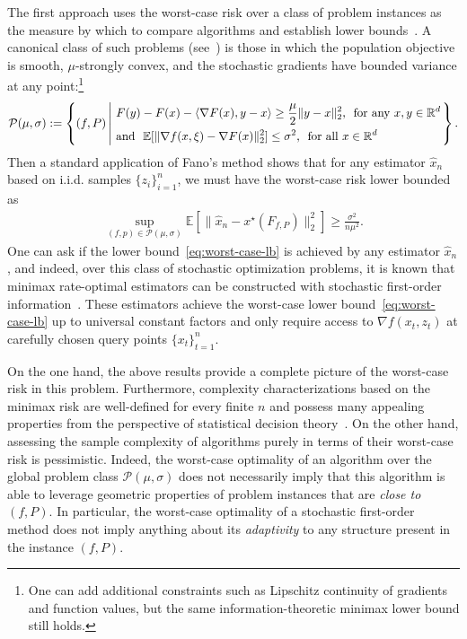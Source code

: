 \documentclass[11pt,twoside]{article}
\numberwithin{equation}{section}
\newcommand{\EE}{\mathbb{E}}
\newcommand{\RR}{\mathbb{R}}
\newcommand{\1}{\mathbf{1}}
\newcommand{\dotp}[1]{\left\langle #1\right\rangle}
\theoremstyle{remark}
\theoremstyle{plain}
\begin{document}
    The first approach uses the worst-case risk over a class of problem instances as the  measure by which to compare algorithms and establish lower bounds~\cite{complexity,agarwal2009information}. 
    A canonical class of such problems (see~\cite{ghadimi2012optimal}) is those in which the population objective is smooth, $\mu$-strongly convex, and the stochastic gradients have bounded variance at any point:\footnote{One can add additional constraints such as Lipschitz continuity of gradients and function values, but the same information-theoretic minimax lower bound still holds.} 
    \begin{align*}
        \mathcal{P}(\mu, \sigma) := \left\{ (f,P) \left| 
	\begin{aligned}
	&\text{ $ F(y) - F(x) - \dotp{\nabla F(x), y-x}\ge \frac{\mu}{2}\|y-x\|_2^2$,  \ for any $x,y \in \RR^d$} \\
	& \text{ and \ $\EE[\|\nabla f(x,\xi) - \nabla F(x)\|_2^2] \le \sigma^2$, \ for all $x \in \RR^d$}
	\end{aligned}
	\right.\right\}.
        \end{align*}
        Then a standard application of Fano's method shows that for any estimator $\widehat{x}_n$ based on i.i.d. samples $\{z_i\}_{i=1}^{n}$, we must have
        the worst-case risk lower bounded as 
        \begin{align} \label{eq:worst-case-lb}
         \sup_{(f,p) \in \mathcal{P}(\mu,\sigma)} \EE[\|\widehat x_n - x^\star(F_{f,P})\|_2^2] \ge \frac{\sigma^2}{n\mu^2}.
        \end{align}
    One can ask if the lower bound~\eqref{eq:worst-case-lb} is achieved by any estimator $\widehat{x}_n$, and indeed,
    over this class of stochastic optimization problems, it is known that minimax rate-optimal estimators can be constructed with stochastic first-order information~\cite{ghadimi2012optimal}. These estimators achieve the worst-case lower bound~\eqref{eq:worst-case-lb} up to universal constant factors and only require access to $\nabla f(x_t, z_t)$ at carefully chosen query points $\{x_t\}_{t = 1}^n$. 
    
    On the one hand, the above results provide a complete picture of the worst-case risk in this problem. Furthermore, complexity characterizations based on the minimax risk are well-defined for every finite $n$ and possess many appealing properties from the perspective of statistical decision theory~\cite{le2012asymptotic, tsybakov2008nonparametric}. On the other hand, assessing the sample complexity of algorithms purely in terms of their worst-case risk is pessimistic. Indeed, the worst-case optimality of an algorithm over the global problem class $\mathcal{P}(\mu, \sigma)$ does not necessarily imply that this algorithm is able to leverage geometric properties of problem instances that are \emph{close to} $(f, P)$. In particular, the worst-case optimality of a stochastic first-order method does not imply anything about its \emph{adaptivity} to any structure present in the instance $(f, P)$.
    
\end{document}
